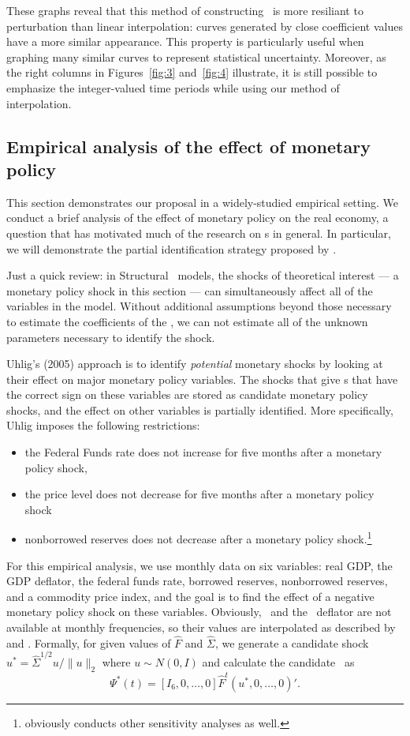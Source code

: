 \documentclass[12pt,fleqn]{article}
\begin{document}
These graphs reveal that this method of constructing \IRFs\ is more
resiliant to perturbation than linear interpolation: curves generated
by close coefficient values have a more similar appearance. This
property is particularly useful when graphing many similar curves to
represent statistical uncertainty. Moreover, as the right columns in
Figures~\ref{fig:3} and~\ref{fig:4} illustrate, it is still possible
to emphasize the integer-valued time periods while using our method of
interpolation.

\subsection{Empirical analysis of the effect of monetary policy}

This section demonstrates our proposal in a widely-studied empirical
setting. We conduct a brief analysis of the effect of monetary policy
on the real economy, a question that has motivated much of the
research on \VAR s in general. In particular, we will demonstrate the
partial identification strategy proposed by \citet{Uhl:05}.

Just a quick review: in Structural \VAR\ models, the shocks of
theoretical interest --- a monetary policy shock in this section ---
can simultaneously affect all of the variables in the model. Without
additional assumptions beyond those necessary to estimate the
coefficients of the \VAR, we can not estimate all of the unknown
parameters necessary to identify the shock.

Uhlig's (2005) approach is to identify \emph{potential} monetary
shocks by looking at their effect on major monetary policy
variables. The shocks that give \IRF s that have the correct sign on
these variables are stored as candidate monetary policy shocks, and
the effect on other variables is partially identified. More
specifically, Uhlig imposes the following restrictions:
\begin{itemize}
\item the Federal Funds rate does not increase for five months after a
  monetary policy shock,
\item the price level does not decrease for five months after a
  monetary policy shock
\item nonborrowed reserves does not decrease after a monetary policy
  shock.\footnote{%
    \citet{Uhl:05} obviously conducts other sensitivity analyses as
    well.} %
\end{itemize}

For this empirical analysis, we use monthly data on six variables:
real GDP, the GDP deflator, the federal funds rate, borrowed reserves,
nonborrowed reserves, and a commodity price index, and the goal is to
find the effect of a negative monetary policy shock on these
variables. Obviously, \GDP\ and the \GDP\ deflator are not available
at monthly frequencies, so their values are interpolated as described
by \citet{BGW:97} and \citet{BeM:98}. Formally, for given values of
$\hat F$ and $\hat \Sigma$, we generate a candidate shock $u^* = \hat
\Sigma^{1/2} u / \| u \|_2$ where $u \sim N(0,I)$ and calculate the
candidate \IRF\ as
\[
\Psi^*(t) = [I_6, 0,\dots,0] \hat F^t (u^*, 0,\dots,0)'.
\]
\end{document}
